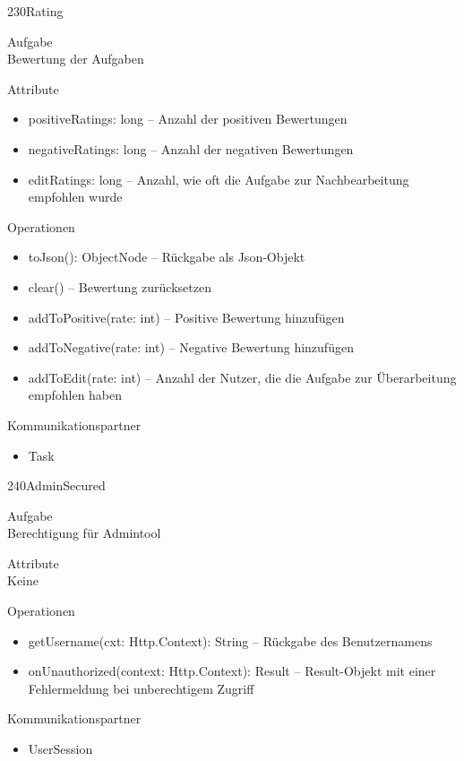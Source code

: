\newpage
\begin{class}{230}{Rating}
\item[Aufgabe]~\\
Bewertung der Aufgaben
\item[Attribute]~\\
\begin{itemize}
\item positiveRatings: long -- Anzahl der positiven Bewertungen
\item negativeRatings: long -- Anzahl der negativen Bewertungen
\item editRatings: long -- Anzahl, wie oft die Aufgabe zur Nachbearbeitung empfohlen wurde
\end{itemize}
\item[Operationen]~\\
\begin{itemize}
\item toJson(): ObjectNode -- Rückgabe als Json-Objekt
\item clear() -- Bewertung zurücksetzen
\item addToPositive(rate: int) -- Positive Bewertung hinzufügen
\item addToNegative(rate: int) -- Negative Bewertung hinzufügen
\item addToEdit(rate: int) -- Anzahl der Nutzer, die die Aufgabe zur Überarbeitung empfohlen haben
\end{itemize}
\item[Kommunikationspartner]~\\
\begin{itemize}
\item Task
\end{itemize}
\end{class}

\newpage
\begin{class}{240}{AdminSecured}
\item[Aufgabe]~\\
Berechtigung für Admintool
\item[Attribute]~\\
Keine
\item[Operationen]~\\
\begin{itemize}
\item getUsername(cxt: Http.Context): String -- Rückgabe des Benutzernamens
\item onUnauthorized(context: Http.Context): Result -- Result-Objekt mit einer Fehlermeldung bei unberechtigem Zugriff
\end{itemize}
\item[Kommunikationspartner]~\\
\begin{itemize}
\item UserSession
\end{itemize}
\end{class}


